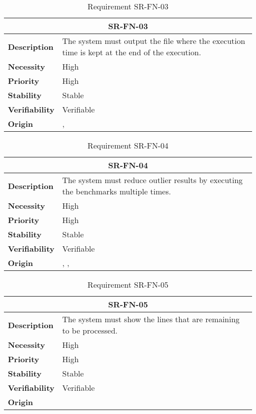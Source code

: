 \begin{table}[H]
    \centering
    \begin{tabular}{l p{10cm}}
        \toprule
        \multicolumn{2}{c}{SR-FN-03} \\
        \toprule
        \textbf{Description}        &  The system must output the file where the execution time is kept at the end of the execution. \\
        \textbf{Necessity}          &  High \\
        \textbf{Priority}           &  High \\
        \textbf{Stability}          &  Stable \\
        \textbf{Verifiability}      & Verifiable \\
        \textbf{Origin}             & \textit{\nameref{tab:ur-ca-09}}, \textit{\nameref{tab:ur-ca-14}} \\
    \end{tabular}
    \caption{Requirement SR-FN-03}
    \label{tab:sr-fn-03}
\end{table}

\begin{table}[H]
    \centering
    \begin{tabular}{l p{10cm}}
        \toprule
        \multicolumn{2}{c}{SR-FN-04} \\
        \toprule
        \textbf{Description}        &  The system must reduce outlier results by executing the benchmarks multiple times. \\
        \textbf{Necessity}          &  High \\
        \textbf{Priority}           &  High \\
        \textbf{Stability}          &  Stable \\
        \textbf{Verifiability}      & Verifiable \\
        \textbf{Origin}             & \textit{\nameref{tab:ur-ca-12}}, \textit{\nameref{tab:ur-ca-16}}, \textit{\nameref{tab:ur-ca-17}} \\
    \end{tabular}
    \caption{Requirement SR-FN-04}
    \label{tab:sr-fn-04}
\end{table}

\begin{table}[H]
    \centering
    \begin{tabular}{l p{10cm}}
        \toprule
        \multicolumn{2}{c}{SR-FN-05} \\
        \toprule
        \textbf{Description}        &  The system must show the lines that are remaining to be processed. \\
        \textbf{Necessity}          &  High \\
        \textbf{Priority}           &  High \\
        \textbf{Stability}          &  Stable \\
        \textbf{Verifiability}      & Verifiable \\
        \textbf{Origin}             & \textit{\nameref{tab:ur-ca-15}} \\
    \end{tabular}
    \caption{Requirement SR-FN-05}
    \label{tab:sr-fn-05}
\end{table}

